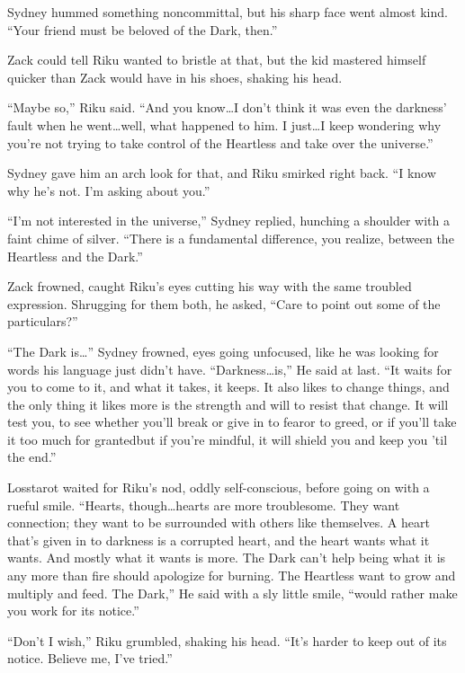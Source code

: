 Sydney hummed something noncommittal, but his sharp face went almost kind. ``Your friend must be beloved of the Dark, then.''

Zack could tell Riku wanted to bristle at that, but the kid mastered himself quicker than Zack would have in his shoes, shaking his head. 

``Maybe so,'' Riku said. ``And you know\ldots I don't think it was even the darkness' fault when he went\ldots well, what happened to him. I just\ldots I keep wondering why you're not trying to take control of the Heartless and take over the universe.''

Sydney gave him an arch look for that, and Riku smirked right back. ``I know why he's not. I'm asking about you.''

``I'm not interested in the universe,'' Sydney replied, hunching a shoulder with a faint chime of silver. ``There is a fundamental difference, you realize, between the Heartless and the Dark.''

Zack frowned, caught Riku's eyes cutting his way with the same troubled expression. Shrugging for them both, he asked, ``Care to point out some of the particulars?''

``The Dark is\ldots'' Sydney frowned, eyes going unfocused, like he was looking for words his language just didn't have. ``Darkness\ldots is,'' He said at last. ``It waits for you to come to it, and what it takes, it keeps. It also likes to change things, and the only thing it likes more is the strength and will to resist that change. It will test you, to see whether you'll break or give in to fear\textemdash or to greed, or if you'll take it too much for granted\textemdash but if you're mindful, it will shield you and keep you 'til the end.''

Losstarot waited for Riku's nod, oddly self-conscious, before going on with a rueful smile. ``Hearts, though\ldots hearts are more troublesome. They want connection; they want to be surrounded with others like themselves. A heart that's given in to darkness is a corrupted heart, and the heart wants what it wants. And mostly what it wants is more. The Dark can't help being what it is any more than fire should apologize for burning. The Heartless want to grow and multiply and feed. The Dark,'' He said with a sly little smile, ``would rather make you work for its notice.''

``Don't I wish,'' Riku grumbled, shaking his head. ``It's harder to keep out of its notice. Believe me, I've tried.''

